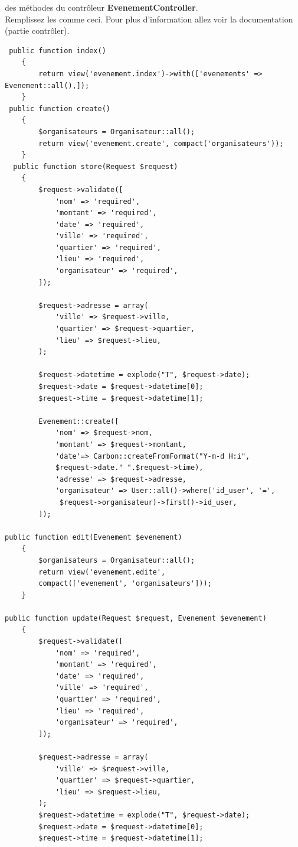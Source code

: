 \documentclass[12pt,a4paper]{article}
\begin{document}
des méthodes du contrôleur \textbf{EvenementController}.\\
Remplissez les comme ceci. Pour plus d'information allez voir la documentation (partie contrôler).
\begin{verbatim}
 public function index()
    {
        return view('evenement.index')->with(['evenements' => Evenement::all(),]);
    }
 public function create()
    {
        $organisateurs = Organisateur::all();
        return view('evenement.create', compact('organisateurs'));
    }
  public function store(Request $request)
    {
        $request->validate([
            'nom' => 'required',
            'montant' => 'required',
            'date' => 'required',
            'ville' => 'required',
            'quartier' => 'required',
            'lieu' => 'required',
            'organisateur' => 'required',
        ]);

        $request->adresse = array(
            'ville' => $request->ville,
            'quartier' => $request->quartier,
            'lieu' => $request->lieu,
        );

        $request->datetime = explode("T", $request->date);
        $request->date = $request->datetime[0];
        $request->time = $request->datetime[1];

        Evenement::create([
            'nom' => $request->nom,
            'montant' => $request->montant,
            'date'=> Carbon::createFromFormat("Y-m-d H:i", 
            $request->date." ".$request->time),
            'adresse' => $request->adresse,
            'organisateur' => User::all()->where('id_user', '=',
             $request->organisateur)->first()->id_user,
        ]);

public function edit(Evenement $evenement)
    {
        $organisateurs = Organisateur::all();
        return view('evenement.edite', 
        compact(['evenement', 'organisateurs']));
    }

public function update(Request $request, Evenement $evenement)
    {
        $request->validate([
            'nom' => 'required',
            'montant' => 'required',
            'date' => 'required',
            'ville' => 'required',
            'quartier' => 'required',
            'lieu' => 'required',
            'organisateur' => 'required',
        ]);

        $request->adresse = array(
            'ville' => $request->ville,
            'quartier' => $request->quartier,
            'lieu' => $request->lieu,
        );
        $request->datetime = explode("T", $request->date);
        $request->date = $request->datetime[0];
        $request->time = $request->datetime[1];


\end{verbatim}
\end{document}
